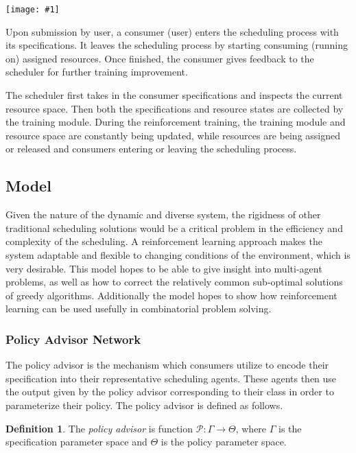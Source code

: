 \documentclass{article}
\theoremstyle{definition}
\newtheorem{definition}{Definition}[section]
\theoremstyle{remark}
\newcommand{\addpic}[1]{\texttt{[image: \#1]}}
\begin{document}
		\addpic{figures/Macro-fix.png}
	
		Upon submission by user, a consumer (user) enters the scheduling process with its specifications. It leaves the scheduling process by starting consuming (running on) assigned resources. Once finished, the consumer gives feedback to the scheduler for further training improvement.
	
		The scheduler first takes in the consumer specifications and inspects the current resource space. Then both the specifications and resource states are collected by the training module. During the reinforcement training, the training module and resource space are constantly being updated, while resources are being assigned or released and consumers entering or leaving the scheduling process.
		

		\subsection{Model}
		
		Given the nature of the dynamic and diverse system, the rigidness of other traditional scheduling solutions would be a critical problem in the efficiency and complexity of the scheduling. A reinforcement learning approach makes the system adaptable and flexible to changing conditions of the environment, which is very desirable. This model hopes to be able to give insight into multi-agent problems, as well as how to correct the relatively common sub-optimal solutions of greedy algorithms. Additionally the model hopes to show how reinforcement learning can be used usefully in combinatorial problem solving.
		
			\subsubsection{Policy Advisor Network}
	
			The policy advisor is the mechanism which consumers utilize to encode their specification into their representative scheduling agents. These agents then use the output given by the policy advisor corresponding to their class in order to parameterize their policy. The policy advisor is defined as follows.
		
			\begin{definition}
				The \emph{policy advisor} is function $\mathcal{P}: \Gamma \rightarrow \Theta$, where $\Gamma$ is the specification parameter space and $\Theta$ is the policy parameter space.
			\end{definition}
				
\end{document}
